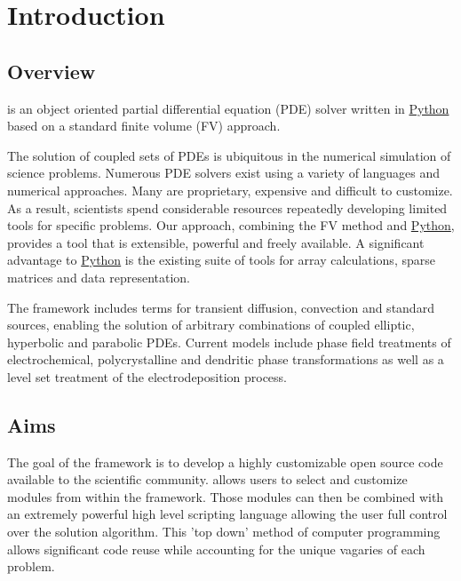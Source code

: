 \chapter{Introduction}

\section{Overview}

\FiPy{} is an object oriented partial differential equation (PDE) solver
written in \href{http://www.python.org/}{Python} based on a standard
finite volume (FV) approach.

The solution of coupled sets of PDEs is ubiquitous in the numerical
simulation of science problems.  Numerous PDE solvers exist using a
variety of languages and numerical approaches. Many are proprietary,
expensive and difficult to customize.  As a result, scientists spend
considerable resources repeatedly developing limited tools for
specific problems.  Our approach, combining the FV method and
\href{http://www.python.org/}{Python}, provides a tool that is
extensible, powerful and freely available. A significant advantage to
\href{http://www.python.org/}{Python} is the existing suite of tools
for array calculations, sparse matrices and data representation.

The \FiPy{} framework includes terms for transient diffusion,
convection and standard sources, enabling the solution of arbitrary
combinations of coupled elliptic, hyperbolic and parabolic
PDEs. Current models include phase field treatments of
electrochemical, polycrystalline and dendritic phase transformations
as well as a level set treatment of the electrodeposition process.

\section{Aims}

The goal of the \FiPy{} framework is to develop a highly customizable
open source code available to the scientific community. \FiPy{} allows
users to select and customize modules from within the framework. Those
modules can then be combined with an extremely powerful high level
scripting language allowing the user full control over the solution
algorithm. This 'top down' method of computer programming allows
significant code reuse while accounting for the unique vagaries of
each problem.

